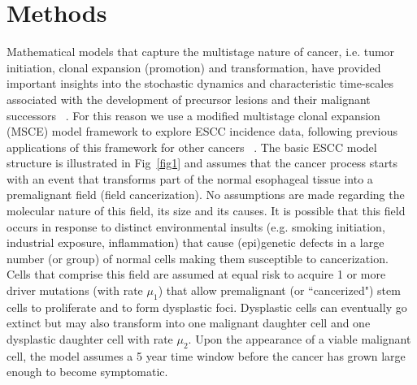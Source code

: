 \documentclass[10pt,letterpaper]{article}
\begin{document}
\section*{Methods}
Mathematical models that capture the multistage nature of cancer, i.e. tumor initiation, clonal expansion (promotion) and transformation, have provided important insights into the stochastic dynamics and characteristic time-scales associated with the development of precursor lesions and their malignant successors ~\cite{Moolgavkar1990, Luebeck2002, Luebeck2013, Meza2008}. For this reason we use a modified multistage clonal expansion (MSCE) model framework to explore ESCC incidence data, following previous applications of this framework for other cancers ~\cite{Luebeck1999, Hazelton2001, Jeon2006, Jeon2008, Meza2010, Curtius2015, Luebeck2019}. The basic ESCC model structure is illustrated in Fig~\ref{fig1} and assumes that the cancer process starts with an event that transforms part of the normal esophageal tissue into a premalignant field (field cancerization). No assumptions are made regarding the molecular nature of this field, its size and its causes. It is possible that this field occurs in response to distinct environmental insults (e.g. smoking initiation, industrial exposure, inflammation) that cause (epi)genetic defects in a large number (or group) of normal cells making them susceptible to cancerization. Cells that comprise this field are assumed at equal risk to acquire 1 or more driver mutations (with rate $\mu_1$) that allow premalignant (or ``cancerized") stem cells to proliferate and to form dysplastic foci. Dysplastic cells can eventually go extinct but may also transform into one malignant daughter cell and one dysplastic daughter cell with rate $\mu_2$.  Upon the appearance of a viable malignant cell, the model assumes a 5 year time window before the cancer has grown large enough to become symptomatic.
\end{document}
